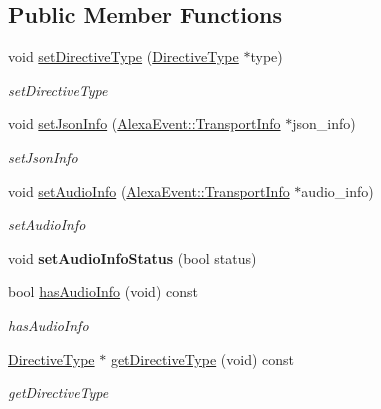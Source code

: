 \subsection*{Public Member Functions}
\begin{DoxyCompactItemize}
\item 
void \hyperlink{classdirective_1_1Directive_a9552b16869e2f677b7d4de6f86e74380}{set\+Directive\+Type} (\hyperlink{classdirective_1_1DirectiveType}{Directive\+Type} $\ast$type)
\begin{DoxyCompactList}\small\item\em set\+Directive\+Type \end{DoxyCompactList}\item 
void \hyperlink{classdirective_1_1Directive_a792b74f87e9b15b12c03d1cf3716e630}{set\+Json\+Info} (\hyperlink{classAlexaEvent_1_1TransportInfo}{Alexa\+Event\+::\+Transport\+Info} $\ast$json\+\_\+info)
\begin{DoxyCompactList}\small\item\em set\+Json\+Info \end{DoxyCompactList}\item 
void \hyperlink{classdirective_1_1Directive_a79ea767cd28592072064c3e0442be9c9}{set\+Audio\+Info} (\hyperlink{classAlexaEvent_1_1TransportInfo}{Alexa\+Event\+::\+Transport\+Info} $\ast$audio\+\_\+info)
\begin{DoxyCompactList}\small\item\em set\+Audio\+Info \end{DoxyCompactList}\item 
\mbox{\label{classdirective_1_1Directive_af93f6ef70333f5a4e81a4a4ab98b75a7}} 
void {\bfseries set\+Audio\+Info\+Status} (bool status)
\item 
bool \hyperlink{classdirective_1_1Directive_a4f8197c2858b56499b9e91ccf7b19aa3}{has\+Audio\+Info} (void) const
\begin{DoxyCompactList}\small\item\em has\+Audio\+Info \end{DoxyCompactList}\item 
\hyperlink{classdirective_1_1DirectiveType}{Directive\+Type} $\ast$ \hyperlink{classdirective_1_1Directive_a4bd9d57de7da2e6d1584e300051de093}{get\+Directive\+Type} (void) const
\begin{DoxyCompactList}\small\item\em get\+Directive\+Type \end{DoxyCompactList}\item 

\end{DoxyCompactItemize}

